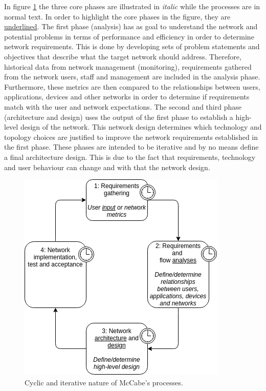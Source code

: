 In figure \ref{fig:mccabe-process} the three core phases are illustrated in \textit{italic} while the processes are in normal text. In order to highlight the core phases in the figure, they are \underline{underlined}. The first phase (analysis) has as goal to understand the network and potential problems in terms of performance and efficiency in order to determine network requirements. This is done by developing sets of problem statements and objectives that describe what the target network should address. Therefore, historical data from network management (monitoring), requirements gathered from the network users, staff and management are included in the analysis phase. Furthermore, these metrics are then compared to the relationships between users, applications, devices and other networks in order to determine if requirements match with the user and network expectations. The second and third phase (architecture and design) uses the output of the first phase to establish a high-level design of the network. This network design determines which technology and topology choices are justified to improve the network requirements established in the first phase. These phases are intended to be iterative and by no means define a final architecture design. This is due to the fact that requirements, technology and user behaviour can change and with that the network design.

\begin{figure}[H]
\centering
\includegraphics[width=\columnwidth/2]{Images/mccabe-process.png}
\caption{Cyclic and iterative nature of McCabe's processes.}
\label{fig:mccabe-process}
\end{figure}

